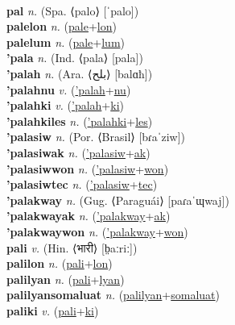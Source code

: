  \label{pale} \\
\textbf{pal} \textit{n.} (Spa. ⟨palo⟩ [ˈpalo])
 \label{pal} \\
\textbf{palelon} \textit{n.} (\hyperref[pale]{pale}+\hyperref[lon]{lon})
 \label{palelon} \\
\textbf{palelum} \textit{n.} (\hyperref[pale]{pale}+\hyperref[lum]{lum})
 \label{palelum} \\
\textbf{'pala} \textit{n.} (Ind. ⟨pala⟩ [pala])
 \label{'pala} \\
\textbf{'palah} \textit{n.} (Ara. ⟨بلح⟩ [balɑħ])
 \label{'palah} \\
\textbf{'palahnu} \textit{v.} (\hyperref['palah]{'palah}+\hyperref[nu]{nu})
 \label{'palahnu} \\
\textbf{'palahki} \textit{v.} (\hyperref['palah]{'palah}+\hyperref[ki]{ki})
 \label{'palahki} \\
\textbf{'palahkiles} \textit{n.} (\hyperref['palahki]{'palahki}+\hyperref[les]{les})
 \label{'palahkiles} \\
\textbf{'palasiw} \textit{n.} (Por. ⟨Brasil⟩ [bɾaˈziw])
 \label{'palasiw} \\
\textbf{'palasiwak} \textit{n.} (\hyperref['palasiw]{'palasiw}+\hyperref[ak]{ak})
 \label{'palasiwak} \\
\textbf{'palasiwwon} \textit{n.} (\hyperref['palasiw]{'palasiw}+\hyperref[won]{won})
 \label{'palasiwwon} \\
\textbf{'palasiwtec} \textit{n.} (\hyperref['palasiw]{'palasiw}+\hyperref[tec]{tec})
 \label{'palasiwtec} \\
\textbf{'palakway} \textit{n.} (Gug. ⟨Paraguái⟩ [paɾaˈɰwaj])
 \label{'palakway} \\
\textbf{'palakwayak} \textit{n.} (\hyperref['palakway]{'palakway}+\hyperref[ak]{ak})
 \label{'palakwayak} \\
\textbf{'palakwaywon} \textit{n.} (\hyperref['palakway]{'palakway}+\hyperref[won]{won})
 \label{'palakwaywon} \\
\textbf{pali} \textit{v.} (Hin. ⟨भारी⟩ [b̤aːriː])
 \label{pali} \\
\textbf{palilon} \textit{n.} (\hyperref[pali]{pali}+\hyperref[lon]{lon})
 \label{palilon} \\
\textbf{palilyan} \textit{n.} (\hyperref[pali]{pali}+\hyperref[lyan]{lyan})
 \label{palilyan} \\
\textbf{palilyansomaluat} \textit{n.} (\hyperref[palilyan]{palilyan}+\hyperref[somaluat]{somaluat})
 \label{palilyansomaluat} \\
\textbf{paliki} \textit{v.} (\hyperref[pali]{pali}+\hyperref[ki]{ki})
